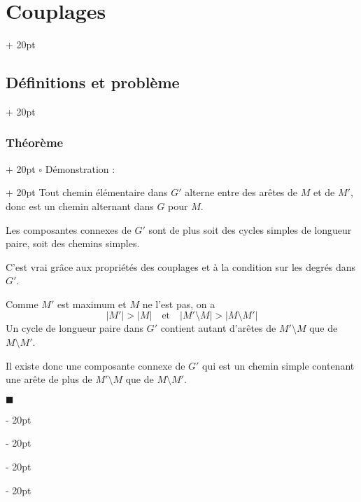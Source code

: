 \documentclass[a4paper, 12pt, twoside]{article}
\newcommand{\abs}[1]{\left\lvert #1 \right\rvert}
\newcommand{\ind}[1][20pt]{\advance\leftskip + #1}
\newcommand{\deind}[1][20pt]{\advance\leftskip - #1}
\newenvironment{indt}[2][20pt]{#2 \par \ind[#1]}{\par \deind} %
\newenvironment{proof}[1][{Démonstration :}]{\begin{indt}{$\square$ #1}}{$\blacksquare$ \end{indt}}
\begin{document}
\begin{indt}{\section{Couplages}}
\begin{indt}{\subsection{Définitions et problème}}
\begin{indt}{\subsubsection{Théorème}}
\begin{proof}
                    Tout chemin élémentaire dans $G'$ alterne entre des arêtes de $M$ et de $M'$, donc est un chemin alternant dans $G$ pour $M$.

                    Les composantes connexes de $G'$ sont de plus soit des cycles simples de longueur paire, soit des chemins simples.

                    \begin{center}
                    \end{center}

                    C'est vrai grâce aux propriétés des couplages et à la condition sur les degrés dans $G'$.

                    Comme $M'$ est maximum et $M$ ne l'est pas, on a
                    \[
                        \abs{M'} > \abs M \quad \text{et} \quad \abs{M' \setminus M} > \abs{M \setminus M'}
                    \]
                    Un cycle de longueur paire dans $G'$ contient autant d'arêtes de $M' \setminus M$ que de $M \setminus M'$.

                    \vspace{6pt}
                    
                    Il existe donc une composante connexe de $G'$ qui est un chemin simple contenant une arête de plus de $M'\setminus M$ que de $M \setminus M'$.


\end{proof}
\end{indt}
\end{indt}
\end{indt}
\end{document}

